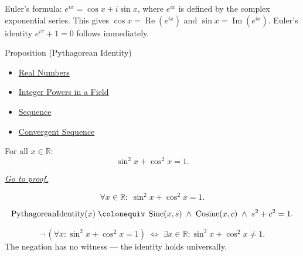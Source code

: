 \begin{remark*}[Relationship to $e^{ix}$]
Euler's formula: $e^{ix} = \cos x + i\sin x$, where $e^{ix}$ is
defined by the complex exponential series. This gives $\cos x =
\operatorname{Re}(e^{ix})$ and $\sin x = \operatorname{Im}(e^{ix})$.
Euler's identity $e^{i\pi} + 1 = 0$ follows immediately.
\end{remark*}


\begin{propositionbox}{Proposition (Pythagorean Identity)}

\begin{dependencies}
\begin{itemize}
  \item \hyperref[def:reals]{Real Numbers}
  \item \hyperref[def:two-sided-inverse]{Integer Powers in a Field}
  \item \hyperref[def:sequence]{Sequence}
  \item \hyperref[def:convergent-sequence]{Convergent Sequence}
\end{itemize}
\end{dependencies}
\begin{proposition}
\label{prop:pythagorean-identity}
For all $x \in \mathbb{R}$:
\[
  \sin^2 x + \cos^2 x = 1.
\]

\smallskip\noindent
\hyperref[prf:pythagorean-identity]{\textit{Go to proof.}}
\end{proposition}
\end{propositionbox}\begin{remark*}
\[
  \forall x \in \mathbb{R} :\; \sin^2 x + \cos^2 x = 1.
\]
\end{remark*}

\begin{remark*}
\[
  \operatorname{PythagoreanIdentity}(x)
  \;\colonequiv\;
  \operatorname{Sine}(x,s) \;\wedge\; \operatorname{Cosine}(x,c)
  \;\wedge\; s^2 + c^2 = 1.
\]
\end{remark*}

\begin{remark*}
\[
  \neg\,(\forall x:\sin^2 x+\cos^2 x=1)
  \;\iff\;
  \exists x\in\mathbb{R}:\sin^2 x+\cos^2 x\neq 1.
\]
The negation has no witness --- the identity holds universally.
\end{remark*}

